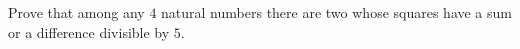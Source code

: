 Prove that among any $4$ natural numbers there are two whose squares have a sum or a difference divisible by $5$.
